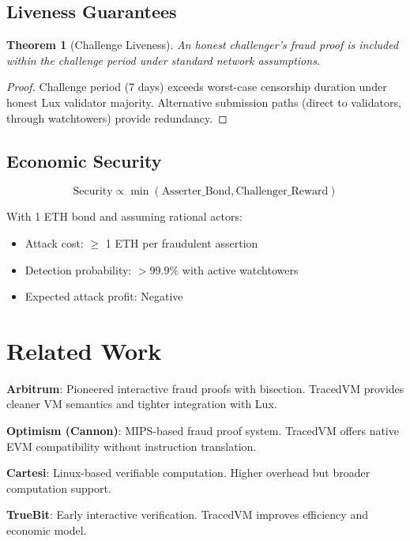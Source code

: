 \documentclass[11pt,a4paper]{article}
\newtheorem{theorem}{Theorem}
\begin{document}
\subsection{Liveness Guarantees}

\begin{theorem}[Challenge Liveness]
An honest challenger's fraud proof is included within the challenge period under standard network assumptions.
\end{theorem}

\begin{proof}
Challenge period (7 days) exceeds worst-case censorship duration under honest Lux validator majority. Alternative submission paths (direct to validators, through watchtowers) provide redundancy.
\end{proof}

\subsection{Economic Security}

\begin{equation}
    \text{Security} \propto \min(\text{Asserter\_Bond}, \text{Challenger\_Reward})
\end{equation}

With 1 ETH bond and assuming rational actors:
\begin{itemize}
    \item Attack cost: $\geq$ 1 ETH per fraudulent assertion
    \item Detection probability: $> 99.9\%$ with active watchtowers
    \item Expected attack profit: Negative
\end{itemize}

\section{Related Work}

\textbf{Arbitrum}: Pioneered interactive fraud proofs with bisection. TracedVM provides cleaner VM semantics and tighter integration with Lux.

\textbf{Optimism (Cannon)}: MIPS-based fraud proof system. TracedVM offers native EVM compatibility without instruction translation.

\textbf{Cartesi}: Linux-based verifiable computation. Higher overhead but broader computation support.

\textbf{TrueBit}: Early interactive verification. TracedVM improves efficiency and economic model.
\end{document}
